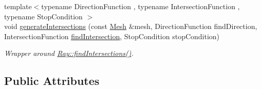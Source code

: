 \begin{DoxyCompactItemize}
{\footnotesize template$<$typename Direction\+Function , typename Intersection\+Function , typename Stop\+Condition $>$ }\\void \hyperlink{classraytracer_1_1LaserRay_a50a1b65c99c56fe6eb7fd89e01f84acf}{generate\+Intersections} (const \hyperlink{classraytracer_1_1Mesh}{Mesh} \&mesh, Direction\+Function find\+Direction, Intersection\+Function \hyperlink{namespaceraytracer_ae44c3032cf96db5f4ba9c07f12c9a207}{find\+Intersection}, Stop\+Condition stop\+Condition)
\begin{DoxyCompactList}\small\item\em Wrapper around \hyperlink{classraytracer_1_1Ray_a9ebcb3641ec730e5b94452833b69c68d}{Ray\+::find\+Intersections()}. \end{DoxyCompactList}\end{DoxyCompactItemize}
\subsection*{Public Attributes}

